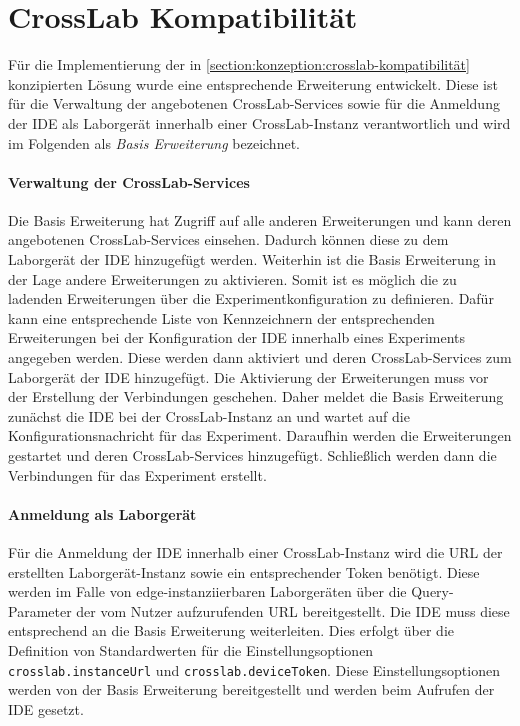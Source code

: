 \section{CrossLab Kompatibilität}\label{section:prototypische-implementierung:crosslab-kompatibilität}


Für die Implementierung der in \autoref{section:konzeption:crosslab-kompatibilität} konzipierten Lösung wurde eine entsprechende Erweiterung entwickelt. Diese ist für die Verwaltung der angebotenen CrossLab-Services sowie für die Anmeldung der IDE als Laborgerät innerhalb einer CrossLab-Instanz verantwortlich und wird im Folgenden als \textit{Basis Erweiterung} bezeichnet.

\paragraph{Verwaltung der CrossLab-Services}
Die Basis Erweiterung hat Zugriff auf alle anderen Erweiterungen und kann deren angebotenen CrossLab-Services einsehen. Dadurch können diese zu dem Laborgerät der IDE hinzugefügt werden. Weiterhin ist die Basis Erweiterung in der Lage andere Erweiterungen zu aktivieren. Somit ist es möglich die zu ladenden Erweiterungen über die Experimentkonfiguration zu definieren. Dafür kann eine entsprechende Liste von Kennzeichnern der entsprechenden Erweiterungen bei der Konfiguration der IDE innerhalb eines Experiments angegeben werden. Diese werden dann aktiviert und deren CrossLab-Services zum Laborgerät der IDE hinzugefügt. Die Aktivierung der Erweiterungen muss vor der Erstellung der Verbindungen geschehen. Daher meldet die Basis Erweiterung zunächst die IDE bei der CrossLab-Instanz an und wartet auf die Konfigurationsnachricht für das Experiment. Daraufhin werden die Erweiterungen gestartet und deren CrossLab-Services hinzugefügt. Schließlich werden dann die Verbindungen für das Experiment erstellt.

\paragraph{Anmeldung als Laborgerät}
Für die Anmeldung der IDE innerhalb einer CrossLab-Instanz wird die URL der erstellten Laborgerät-Instanz sowie ein entsprechender Token benötigt. Diese werden im Falle von edge-instanziierbaren Laborgeräten über die Query-Parameter der vom Nutzer aufzurufenden URL bereitgestellt. Die IDE muss diese entsprechend an die Basis Erweiterung weiterleiten. Dies erfolgt über die Definition von Standardwerten für die Einstellungsoptionen \texttt{crosslab.instanceUrl} und \texttt{crosslab.deviceToken}. Diese Einstellungsoptionen werden von der Basis Erweiterung bereitgestellt und werden beim Aufrufen der IDE gesetzt.